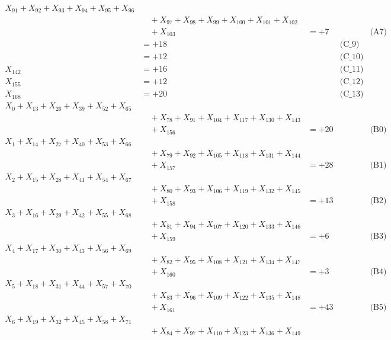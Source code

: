 \documentclass[a4paper,10pt]{article}
\begin{document}
{\begin{align}
X_{91} + X_{92} + X_{93} + X_{94} + X_{95} + X_{96} \\[0.1ex]
&\quad  + X_{97} + X_{98} + X_{99} + X_{100} + X_{101} + X_{102} \\[0.1ex]
&\quad  + X_{103} &= +7 && \text{(A7)} \\
 &= +18 && \text{(C\_9)} \\
 &= +12 && \text{(C\_10)} \\
\allowbreak
X_{142} &= +16 && \text{(C\_11)} \\
X_{155} &= +12 && \text{(C\_12)} \\
X_{168} &= +20 && \text{(C\_13)} \\
X_{0} + X_{13} + X_{26} + X_{39} + X_{52} + X_{65} \\[0.1ex]
&\quad  + X_{78} + X_{91} + X_{104} + X_{117} + X_{130} + X_{143} \\[0.1ex]
&\quad  + X_{156} &= +20 && \text{(B0)} \\
X_{1} + X_{14} + X_{27} + X_{40} + X_{53} + X_{66} \\[0.1ex]
&\quad  + X_{79} + X_{92} + X_{105} + X_{118} + X_{131} + X_{144} \\[0.1ex]
&\quad  + X_{157} &= +28 && \text{(B1)} \\
\allowbreak
X_{2} + X_{15} + X_{28} + X_{41} + X_{54} + X_{67} \\[0.1ex]
&\quad  + X_{80} + X_{93} + X_{106} + X_{119} + X_{132} + X_{145} \\[0.1ex]
&\quad  + X_{158} &= +13 && \text{(B2)} \\
X_{3} + X_{16} + X_{29} + X_{42} + X_{55} + X_{68} \\[0.1ex]
&\quad  + X_{81} + X_{94} + X_{107} + X_{120} + X_{133} + X_{146} \\[0.1ex]
&\quad  + X_{159} &= +6 && \text{(B3)} \\
X_{4} + X_{17} + X_{30} + X_{43} + X_{56} + X_{69} \\[0.1ex]
&\quad  + X_{82} + X_{95} + X_{108} + X_{121} + X_{134} + X_{147} \\[0.1ex]
&\quad  + X_{160} &= +3 && \text{(B4)} \\
X_{5} + X_{18} + X_{31} + X_{44} + X_{57} + X_{70} \\[0.1ex]
&\quad  + X_{83} + X_{96} + X_{109} + X_{122} + X_{135} + X_{148} \\[0.1ex]
&\quad  + X_{161} &= +43 && \text{(B5)} \\
X_{6} + X_{19} + X_{32} + X_{45} + X_{58} + X_{71} \\[0.1ex]
&\quad  + X_{84} + X_{97} + X_{110} + X_{123} + X_{136} + X_{149} \\[0.1ex]

\end{align}}
\end{document}
